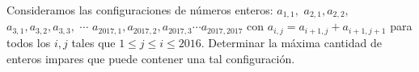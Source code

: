 Consideramos las configuraciones de números enteros: \newline 
$a_{1,1},$ \newline 
$a_{2,1}, a_{2,2},$ \newline 
$a_{3,1}, a_{3,2}, a_{3,3},$ \newline 
$\cdots$ \newline 
$a_{2017,1}, a_{2017,2}, a_{2017,3} \cdots a_{2017,2017}$ \newline 
con $a_{i,j} = a_{i+1,j} + a_{i+1,j+1}$ para todos los $i,j$ tales que $1 \leq j \leq i \leq 2016$. \newline 
Determinar la máxima cantidad de enteros impares que puede contener una tal configuración.
